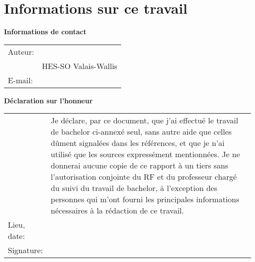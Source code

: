 \chapter*{Informations sur ce travail}

\vspace{\fill}

\textbf{Informations de contact}

\begin{tabularx}{\textwidth}{N{2.5cm}X}
	Auteur:	& \AuthorFirstName \space \AuthorLastName \\
	& HES-SO Valais-Wallis \\
	E-mail: & \email{\AuthorEmail}
\end{tabularx}

\vspace{8.5cm}

\textbf{Déclaration sur l’honneur}

{\renewcommand{\arraystretch}{2}
\begin{tabularx}{\textwidth}{N{2.5cm}X}
	& Je déclare, par ce document, que j'ai effectué le travail 
	  de bachelor ci-annexé seul, sans autre aide que celles dûment 
	  signalées dans les références, et que je n'ai utilisé que les 
	  sources expressément mentionnées. Je ne donnerai aucune copie de 
	  ce rapport à un tiers sans l'autorisation conjointe du RF et du 
	  professeur chargé du suivi du travail de bachelor, à l'exception des 
	  personnes qui m'ont fourni les principales informations nécessaires 
	  à la rédaction de ce travail. \\
	Lieu, date: & \underline{\hspace{7cm}} \\ 
	Signature: & \underline{\hspace{7cm}}
\end{tabularx}
}

\vspace{\fill}